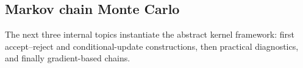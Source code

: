 \subsection{Markov chain Monte Carlo}
\label{subsec:mcmc}

The next three internal topics instantiate the abstract kernel framework: first accept--reject and conditional-update constructions, then practical diagnostics, and finally gradient-based chains.




